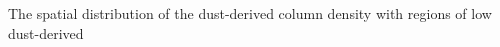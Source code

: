 \label{fig:tracer_syst_spatial}

The spatial distribution of the dust-derived column density with regions of low dust-derived 